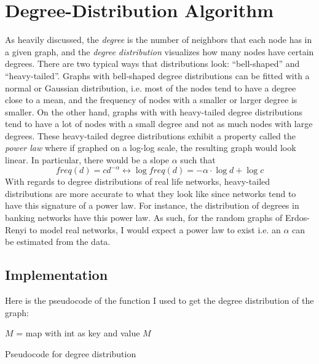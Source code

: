 \documentclass{article}
\begin{document}
\section{Degree-Distribution Algorithm}
    As heavily discussed, the \textit{degree} is the number of neighbors that
    each node has in a given graph, and the \textit{degree distribution} 
    visualizes how many nodes have certain degrees. There are two typical ways
    that distributions look: ``bell-shaped'' and ``heavy-tailed''. Graphs with
    bell-shaped degree distributions can be fitted with a normal or Gaussian 
    distribution, i.e. most of the nodes tend to have a degree close to a mean,
    and the frequency of nodes with a smaller or larger degree is smaller. On
    the other hand, graphs with with heavy-tailed degree distributions tend to
    have a lot of nodes with a small degree and not as much nodes with large
    degrees. 
    \nextblurb
    These heavy-tailed degree distributions exhibit a property called 
    the \textit{power law} where if graphed on a log-log scale, the resulting 
    graph would look linear. In particular, there would be a slope $\alpha$ such 
    that 
    \begin{equation*}
        freq(d) = cd^{-\alpha} \longleftrightarrow \log{freq(d)} = 
            -\alpha \cdot \log{d} + \log{c}
    \end{equation*}
    With regards to degree distributions of real life networks, heavy-tailed 
    distributions are more accurate to what they look like since networks tend 
    to have this signature of a power law. For instance, the distribution of 
    degrees in banking networks have this power law. As such, for the random 
    graphs of Erdos-Renyi to model real networks, I would expect a power law to 
    exist i.e. an $\alpha$ can be estimated from the data.
\subsection{Implementation}
    Here is the pseudocode of the function I used to get the degree distribution
    of the graph:
    \begin{algorithm}
        \BlankLine
        $M$ = map with int as key and value\;
        \Return $M$\;
        \caption{Pseudocode for degree distribution}
    \end{algorithm}
        
\end{document}
